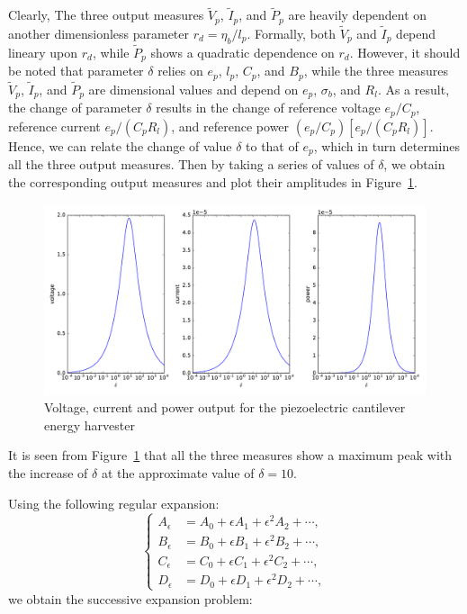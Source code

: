 \documentclass{article}
\begin{document}
Clearly, The three output measures $\tilde{V}_p$, $\tilde{I}_p$, and $\tilde{P}_p$ are heavily dependent on another dimensionless parameter $r_d = \eta_b/l_p$. Formally, both $\tilde{V}_p$ and $\tilde{I}_p$ depend lineary upon $r_d$, while $\tilde{P}_p$ shows a quadratic dependence on $r_d$. However, it should be noted that parameter $\delta$ relies on $e_p$, $l_p$, $C_p$, and $B_p$, while the three measures $\tilde{V}_p$, $\tilde{I}_p$, and $\tilde{P}_p$ are dimensional values and depend on $e_p$, $\sigma_b$, and $R_l$. As a result, the change of parameter $\delta$ results in the change of reference voltage $e_p / C_p$, reference current $e_p / (C_p R_l)$, and reference power $(e_p / C_p)[e_p / (C_p R_l)]$. Hence, we can relate the change of value $\delta$ to that of $e_p$, which in turn determines all the three output measures. Then by taking a series of values of $\delta$, we obtain the corresponding output measures and plot their amplitudes in Figure~\ref{fig:fig_sol_analytic_perf_fun}. 
\begin{figure}[!htbp]
    \centering
    \includegraphics[width=\textwidth]{./img_eig_asy/fig_sol_analytic_perf_fun}
    \caption{Voltage, current and power output for the piezoelectric cantilever energy harvester}
    \label{fig:fig_sol_analytic_perf_fun}
\end{figure}


It is seen from Figure~\ref{fig:fig_sol_analytic_perf_fun} that all the three measures show a maximum peak with the increase of $\delta$ at the approximate value of $\delta = 10$.


Using the following regular expansion:
\begin{equation}
    \left\{\begin{aligned}
        A_\epsilon &= A_0 + \epsilon A_1 + \epsilon^2 A_2 + \cdots, \\
        B_\epsilon &= B_0 + \epsilon B_1 + \epsilon^2 B_2 + \cdots, \\
        C_\epsilon &= C_0 + \epsilon C_1 + \epsilon^2 C_2 + \cdots, \\
        D_\epsilon &= D_0 + \epsilon D_1 + \epsilon^2 D_2 + \cdots, 
    \end{aligned}\right.
\end{equation}
we obtain the successive expansion problem:
\end{document}
